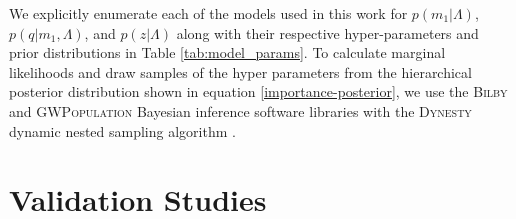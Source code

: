 \documentclass[twocolumn, linenumber]{aastex63}
\begin{document}
\noindent
We explicitly enumerate each of the models used in this work for $p(m_1|\Lambda)$, $p(q|m_1, \Lambda)$, and $p(z|\Lambda)$ along with their respective hyper-parameters and prior distributions in Table \ref{tab:model_params}. To calculate marginal likelihoods and draw samples of the hyper parameters from the hierarchical posterior distribution shown in equation \ref{importance-posterior}, we use the \textsc{Bilby} \citep{Ashton_2019, bilby_gwtc1} and \textsc{GWPopulation} \citep{Talbot_2019} Bayesian inference software libraries with the \textsc{Dynesty} dynamic nested sampling algorithm \citep{Speagle_2020}.


\section{Validation Studies} \label{sec:validation}
\end{document}
